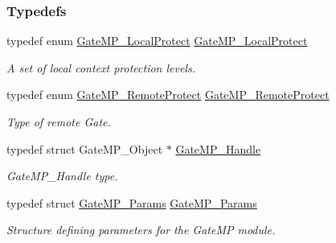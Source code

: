 \subsubsection*{Typedefs}
\begin{DoxyCompactItemize}
\item 
typedef enum \hyperlink{_gate_m_p_8h_a3877bd64627d7449d3687e8b06939652}{GateMP\_\-LocalProtect} \hyperlink{_gate_m_p_8h_accb7b6c936aebe10e31d909310398fe5}{GateMP\_\-LocalProtect}
\begin{DoxyCompactList}\small\item\em A set of local context protection levels. \item\end{DoxyCompactList}\item 
typedef enum \hyperlink{_gate_m_p_8h_a88716d5706d8fa8c6a3b9a4f023ef1d8}{GateMP\_\-RemoteProtect} \hyperlink{_gate_m_p_8h_a1400ba94db5b5fefd196649a9c9a4c63}{GateMP\_\-RemoteProtect}
\begin{DoxyCompactList}\small\item\em Type of remote Gate. \item\end{DoxyCompactList}\item 
typedef struct GateMP\_\-Object $\ast$ \hyperlink{_gate_m_p_8h_ad5bb259f928a14e98d973334bc60ebb3}{GateMP\_\-Handle}
\begin{DoxyCompactList}\small\item\em GateMP\_\-Handle type. \item\end{DoxyCompactList}\item 
typedef struct \hyperlink{struct_gate_m_p___params}{GateMP\_\-Params} \hyperlink{_gate_m_p_8h_aa87249c5e69b88bfaa4ee817cacd3b42}{GateMP\_\-Params}
\begin{DoxyCompactList}\small\item\em Structure defining parameters for the GateMP module. \item\end{DoxyCompactList}\end{DoxyCompactItemize}
